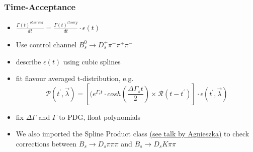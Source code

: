 \documentclass[]{beamer}
\begin{document}
\begin{frame}
\frametitle{Time-Acceptance}


\begin{itemize}

\item $\frac{\Gamma(t)^{observed}}{dt} = \frac{\Gamma(t)^{theory}}{dt} \cdot \epsilon(t)$

\item Use control channel $B_{s}^{0}\to D_{s}^{+}\pi^{-}\pi^{+}\pi^{-}$ 

\item describe $\epsilon(t)$ using cubic splines

\item fit flavour averaged t-distribution, e.g. \[\mathcal{P}(t^{'},\vec{\lambda}) = \left[ (e^{\Gamma_{s}t}\cdot cosh(\frac{\Delta\Gamma_{s}t}{2}) \times \mathcal{R}(t - t^{'})\right] \cdot \epsilon(t^{'}, \vec{\lambda})\]

\item fix $\Delta\Gamma$ and $\Gamma$ to PDG, float polynomials

\item We also imported the Spline Product class \textcolor{blue}{\href{https://indico.cern.ch/event/606600/contributions/2692163/attachments/1508860/2352208/2017-08-16-DsK-SplineProduct.pdf}{(see talk by Agnieszka)}} to check corrections between $B_{s}\to D_{s} \pi\pi\pi$ and $B_{s}\to D_{s} K\pi\pi$ 

\end{itemize} 

\end{frame}
\end{document}
